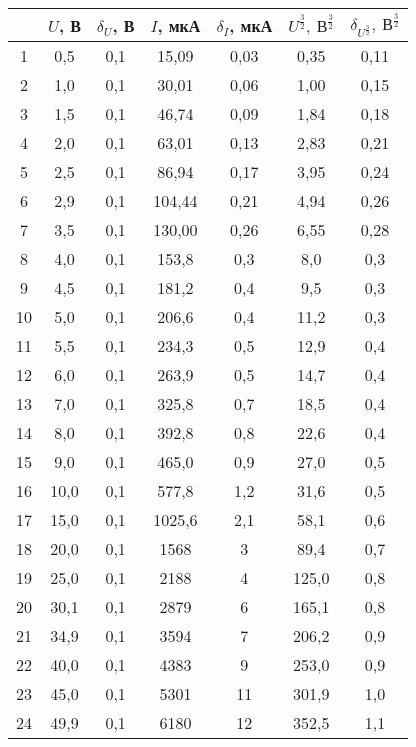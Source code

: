 \begin{table}
\centering
\label{tbl:7}
\begin{tabular}{|c|c|c|c|c|c|c|}
\hline
 & $U$, В & $\delta_U$, В & $I$, мкА & $\delta_I$, мкА & $U^{\frac{3}{2}},\ В^{\frac{3}{2}}$ & $\delta_{U^{\frac{3}{2}}},\ В^{\frac{3}{2}}$ \\
\hline
1 & 0,5 & 0,1 & 15,09 & 0,03 & 0,35 & 0,11 \\
\cline{1-7}
2 & 1,0 & 0,1 & 30,01 & 0,06 & 1,00 & 0,15 \\
\cline{1-7}
3 & 1,5 & 0,1 & 46,74 & 0,09 & 1,84 & 0,18 \\
\cline{1-7}
4 & 2,0 & 0,1 & 63,01 & 0,13 & 2,83 & 0,21 \\
\cline{1-7}
5 & 2,5 & 0,1 & 86,94 & 0,17 & 3,95 & 0,24 \\
\cline{1-7}
6 & 2,9 & 0,1 & 104,44 & 0,21 & 4,94 & 0,26 \\
\cline{1-7}
7 & 3,5 & 0,1 & 130,00 & 0,26 & 6,55 & 0,28 \\
\cline{1-7}
8 & 4,0 & 0,1 & 153,8 & 0,3 & 8,0 & 0,3 \\
\cline{1-7}
9 & 4,5 & 0,1 & 181,2 & 0,4 & 9,5 & 0,3 \\
\cline{1-7}
10 & 5,0 & 0,1 & 206,6 & 0,4 & 11,2 & 0,3 \\
\cline{1-7}
11 & 5,5 & 0,1 & 234,3 & 0,5 & 12,9 & 0,4 \\
\cline{1-7}
12 & 6,0 & 0,1 & 263,9 & 0,5 & 14,7 & 0,4 \\
\cline{1-7}
13 & 7,0 & 0,1 & 325,8 & 0,7 & 18,5 & 0,4 \\
\cline{1-7}
14 & 8,0 & 0,1 & 392,8 & 0,8 & 22,6 & 0,4 \\
\cline{1-7}
15 & 9,0 & 0,1 & 465,0 & 0,9 & 27,0 & 0,5 \\
\cline{1-7}
16 & 10,0 & 0,1 & 577,8 & 1,2 & 31,6 & 0,5 \\
\cline{1-7}
17 & 15,0 & 0,1 & 1025,6 & 2,1 & 58,1 & 0,6 \\
\cline{1-7}
18 & 20,0 & 0,1 & 1568 & 3 & 89,4 & 0,7 \\
\cline{1-7}
19 & 25,0 & 0,1 & 2188 & 4 & 125,0 & 0,8 \\
\cline{1-7}
20 & 30,1 & 0,1 & 2879 & 6 & 165,1 & 0,8 \\
\cline{1-7}
21 & 34,9 & 0,1 & 3594 & 7 & 206,2 & 0,9 \\
\cline{1-7}
22 & 40,0 & 0,1 & 4383 & 9 & 253,0 & 0,9 \\
\cline{1-7}
23 & 45,0 & 0,1 & 5301 & 11 & 301,9 & 1,0 \\
\cline{1-7}
24 & 49,9 & 0,1 & 6180 & 12 & 352,5 & 1,1 \\
\cline{1-7}
\hline
\end{tabular}
\end{table}

